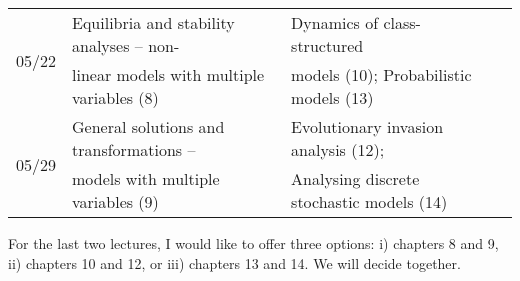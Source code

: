 \documentclass[
	letterpaper,
	12pt
]{article}
\begin{document}
\begin{table}[ht]
\begin{tabular}{@{\extracolsep{\fill}}llll}
		\multirow{2}{*}{05/22} & Equilibria and stability analyses -- non-& Dynamics of class-structured \\[-0.35cm]
		 & linear models with multiple variables (8) & models (10); Probabilistic models (13) \\
		
		\multirow{2}{*}{05/29} & General solutions and transformations -- & Evolutionary invasion analysis (12);\\[-0.35cm]
		 & models with multiple variables (9) & Analysing discrete stochastic models (14) \\
		
	\end{tabular}
\end{table}

\noindent*For the last two lectures, I would like to offer three options: i) chapters 8 and 9, ii) chapters 10 and 12, or iii) chapters 13 and 14. We will decide together.
\end{document}
